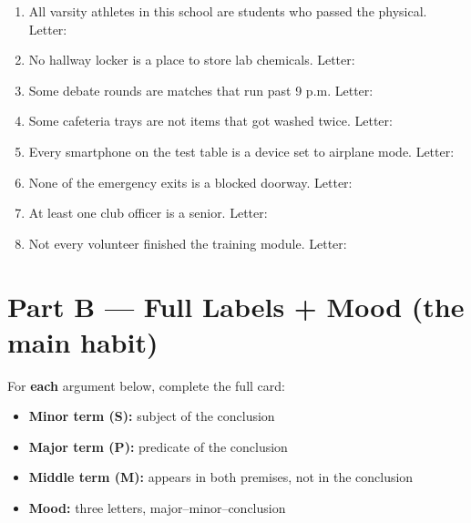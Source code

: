 \documentclass[11pt]{article}
\begin{document}
\begin{enumerate}
\item All varsity athletes in this school are students who passed the physical.
\hfill Letter: \underline{\hspace{0.7in}}

\item No hallway locker is a place to store lab chemicals.
\hfill Letter: \underline{\hspace{0.7in}}

\item Some debate rounds are matches that run past 9 p.m.
\hfill Letter: \underline{\hspace{0.7in}}

\item Some cafeteria trays are not items that got washed twice.
\hfill Letter: \underline{\hspace{0.7in}}

\item Every smartphone on the test table is a device set to airplane mode.
\hfill Letter: \underline{\hspace{0.7in}}

\item None of the emergency exits is a blocked doorway.
\hfill Letter: \underline{\hspace{0.7in}}

\item At least one club officer is a senior.
\hfill Letter: \underline{\hspace{0.7in}}

\item Not every volunteer finished the training module.
\hfill Letter: \underline{\hspace{0.7in}}
\end{enumerate}

\newpage
\section*{Part B --- Full Labels + Mood (the main habit)}
\noindent For \textbf{each} argument below, complete the full card:

\begin{itemize}
\item \textbf{Minor term (S):} subject of the conclusion
\item \textbf{Major term (P):} predicate of the conclusion
\item \textbf{Middle term (M):} appears in both premises, not in the conclusion
\item \textbf{Mood:} three letters, major--minor--conclusion
\end{itemize}
\end{document}
